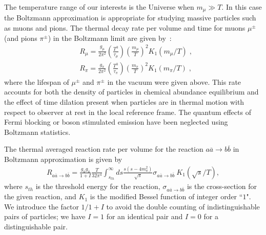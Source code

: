 The temperature range of our interests is the Universe when $m_\mu\gg T$. In this case the Boltzmann approximation is appropriate for studying massive particles such as muons and pions. The thermal decay rate per volume and time for muons $\mu^\pm$ (and pions $\pi^\pm$) in the Boltzmann limit are given by~\cite{Kuznetsova:2010pi}:
\begin{align}
&R_\mu=\frac{g_\mu}{2\pi^2}\left(\frac{T^3}{\tau_\mu}\right)\left(\frac{m_\mu}{T}\right)^2K_1(m_\mu/T)\;,\\
&R_\pi=\frac{g_\pi}{2\pi^2}\left(\frac{T^3}{\tau_\pi}\right)\left(\frac{m_\pi}{T}\right)^2K_1(m_\pi/T)\;, 
\end{align}
where the lifespan of $\mu^\pm$ and $\pi^\pm$ in the vacuum were given above. This rate accounts for both the density of particles in chemical abundance equilibrium and the effect of time dilation present when particles are in thermal motion with respect to observer at rest in the local reference frame. The quantum effects of Fermi blocking or boson stimulated emission have been neglected using Boltzmann statistics.

The thermal averaged reaction rate per volume for the reaction $a\overline{a}\rightarrow b\overline{b}$ in Boltzmann approximation is given by~\cite{Letessier:2002ony}
\begin{align}\label{pairR}
R_{a\overline{a}\rightarrow b\overline{b}}=\frac{g_ag_{\overline{a}}}{1+I}\frac{T}{32\pi^4}\int_{s_{th}}^\infty ds\frac{s(s-4m^2_a)}{\sqrt{s}}\sigma_{a\overline{a}\rightarrow b\overline{b}}~K_1(\sqrt{s}/T),
\end{align}
where $s_{th}$ is the threshold energy for the reaction, $\sigma_{a\overline{a}\rightarrow b\overline{b}}$ is the cross-section for the given reaction, and $K_1$ is the modified
Bessel function of integer order ``$1$". We introduce the factor $1/1+I$ to avoid the double counting of indistinguishable pairs of particles; we have $I=1$ for an identical pair and $I=0$ for a distinguishable pair.

